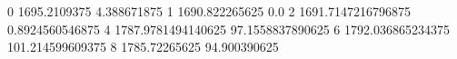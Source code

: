 0 1695.2109375 4.388671875
1 1690.822265625 0.0
2 1691.7147216796875 0.8924560546875
4 1787.9781494140625 97.1558837890625
6 1792.036865234375 101.214599609375
8 1785.72265625 94.900390625
